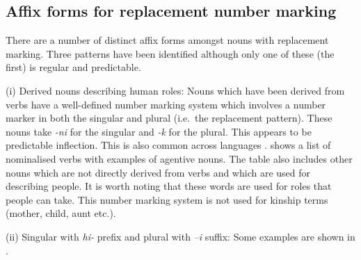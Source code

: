 \documentclass[output=paper]{langsci/langscibook}
\begin{document}
\subsection{Affix forms for replacement number marking} \label{sec:moodie:4.3}

There are a number of distinct affix forms amongst nouns with replacement marking. Three patterns have been identified although only one of these (the first) is regular and predictable.

(i) Derived nouns describing human roles: Nouns which have been derived from verbs have a well-defined number marking system which involves a number marker in both the singular and plural (i.e.\ the replacement pattern). These nouns take \textit{-ni }for the singular and \textit{-k} for the plural. This appears to be predictable inflection. This is also common across  languages \citep[243]{Dimmendaal2000}.  shows a list of nominalised verbs with examples of agentive nouns. The table also includes other nouns which are not directly derived from verbs and which are used for describing people. It is worth noting that these words are used for roles that people can take. This number marking system is not used for kinship terms (mother, child, aunt etc.). 

\begin{table}
\caption{Person referent nouns in singular and plural}
\label{tab:moodie:14}
\end{table}

(ii) Singular with \textit{hi-} prefix and plural with \textit{–i} suffix: Some examples are shown in . 
\end{document}
